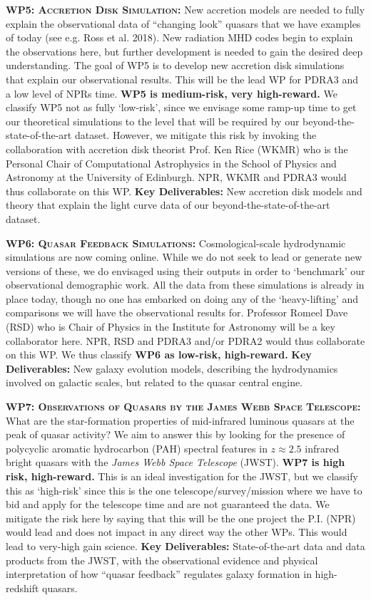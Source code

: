 \documentclass[oneside, a4paper, onecolumn, 11pt]{article}
\begin{document}
\smallskip
\smallskip
\noindent
\textbf{\textsc{WP5: Accretion Disk Simulation:}} 
New accretion models are needed to fully explain the observational
data of ``changing look'' quasars that we have examples of today (see
e.g. Ross et al. 2018). New radiation MHD codes begin to explain the
observations here, but further development is needed to gain the
desired deep understanding. 
The goal of WP5 is to develop new accretion disk simulations that
explain our observational results.  This will be the lead WP for 
PDRA3 and a low level of NPRs time. 
{\bf WP5 is medium-risk, very high-reward.} We
classify WP5 not as fully `low-risk', since we envisage some ramp-up
time to get our theoretical simulations to the level that will be required by 
our beyond-the-state-of-the-art dataset. However, we mitigate this risk
by invoking the collaboration with accretion disk theorist
Prof. Ken Rice (WKMR) who is the Personal Chair of Computational
Astrophysics in the School of Physics and Astronomy at the
University of Edinburgh. NPR, WKMR and PDRA3 would thus collaborate 
on this WP. 
{\bf Key Deliverables:} New accretion disk models and theory that explain the 
light curve data of our beyond-the-state-of-the-art dataset. 


\smallskip
\smallskip
\noindent
\textbf{\textsc{WP6: Quasar Feedback Simulations:}} 
Cosmological-scale hydrodynamic simulations are now coming online. 
While we do not seek to lead or generate new versions of these, we do 
envisaged using their outputs in order to `benchmark' our observational 
demographic work. 
All the data from these simulations is already in place today, though no one 
has embarked on doing any of the `heavy-lifting' and comparisons we will 
have the observational results for. Professor Romeel Dave (RSD) who is Chair of Physics 
in the Institute for Astronomy will be a key collaborator here. 
NPR, RSD and PDRA3 and/or PDRA2 would thus collaborate on this WP. 
We thus classify {\bf WP6 as low-risk, high-reward.}
{\bf Key Deliverables:} New galaxy evolution models, describing the hydrodynamics 
involved on galactic scales, but related to the quasar central engine. 


\smallskip
\smallskip
\noindent
\textbf{\textsc{WP7: Observations of Quasars by the James Webb Space Telescope:}} 
What are the star-formation properties of mid-infrared luminous
quasars at the peak of quasar activity?  We aim to answer this by
looking for the presence of polycyclic aromatic hydrocarbon (PAH)
spectral features in $z \approx 2.5$ infrared bright quasars with the
{\it James Webb Space Telescope} (JWST).  {\bf WP7 is high risk,
high-reward.}  This is an ideal investigation for the JWST, but we
classify this as `high-risk' since this is the one
telescope/survey/mission where we have to bid and apply for the
telescope time and are not guaranteed the data. We mitigate the risk
here by saying that this will be the one project the P.I. (NPR) would lead 
and does not impact in any direct way the other WPs. This would lead to very-high gain science.  {\bf Key Deliverables:}
State-of-the-art data and data products from the JWST, with the
observational evidence and physical interpretation of how ``quasar
feedback'' regulates galaxy formation in high-redshift quasars. 
\end{document}
